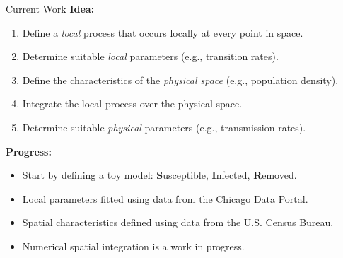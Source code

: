 \begin{slide}{Current Work}
	{\large \textbf{Idea:}}
	\begin{enumerate}
		\item Define a \textit{local} process that occurs locally at every point in space.
		\item Determine suitable \textit{local} parameters (e.g., transition rates).
		\item Define the characteristics of the \textit{physical space} (e.g., population density).
		\item Integrate the local process over the physical space.
		\item Determine suitable \textit{physical} parameters (e.g., transmission rates).
	\end{enumerate}

	\vspace{.5cm}
	
	{\large \textbf{Progress:}}
	\begin{itemize}
		\item Start by defining a toy model: \textbf{S}usceptible, \textbf{I}nfected, \textbf{R}emoved.
		\item Local parameters fitted using data from the \alert{Chicago Data Portal}.
		\item Spatial characteristics defined using data from the \alert{U.S. Census Bureau}.
		\item Numerical spatial integration is a work in progress.
	\end{itemize}
\end{slide}
